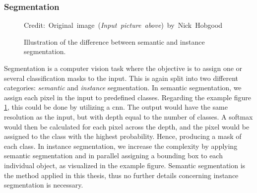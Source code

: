     
\subsubsection{Segmentation}
    \begin{figure}[H]
        \centering
        
        \caption[Difference between semantic and instance segmentation]{Illustration of the difference between semantic and instance segmentation.}
      	\medskip 
        \hspace*{15pt}\hbox{\scriptsize Credit: Original image (\textit{Input picture above}) by Nick Hobgood\cite{clownfish_image}}
        \label{segmentation_fig}
    \end{figure}

    Segmentation is a computer vision task where the objective is to assign one or several classification masks to the input\cite{He_2017_ICCV_segmentation}. This is again split into two different categories: \textit{semantic} and \textit{instance} segmentation. In semantic segmentation, we assign each pixel in the input to predefined classes. Regarding the example figure \ref{segmentation_fig}, this could be done by utilizing a \gls{cnn}. The output would have the same resolution as  the input, but with depth equal to the number of classes. A softmax would then be calculated for each pixel across the depth, and the pixel would be assigned to the class with the highest probability. Hence, producing a mask of each class. In instance segmentation, we increase the complexity by applying semantic segmentation and in parallel assigning a bounding box to each individual object, as visualized in the example figure. Semantic segmentation is the method applied in this thesis, thus no further details concerning instance segmentation is necessary.
    

    


        

    
    